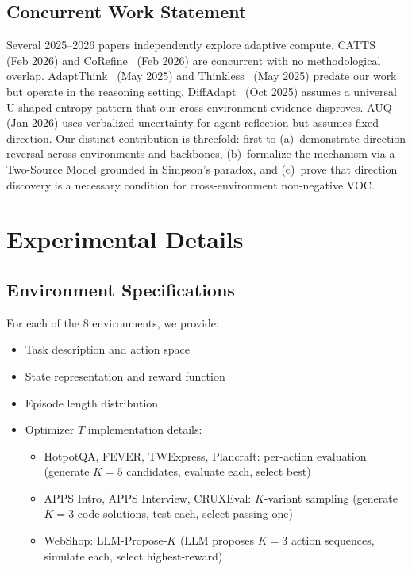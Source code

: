 \subsection{Concurrent Work Statement}

Several 2025--2026 papers independently explore adaptive compute.
CATTS~\citep{catts2026} (Feb 2026) and CoRefine~\citep{corefine2026}
(Feb 2026) are concurrent with no methodological overlap.
AdaptThink~\citep{adaptthink2025} (May 2025) and
Thinkless~\citep{thinkless2025} (May 2025) predate our work but
operate in the reasoning setting. DiffAdapt~\citep{diffadapt2025}
(Oct 2025) assumes a universal U-shaped entropy pattern that our
cross-environment evidence disproves.
AUQ~\citep{auq2026} (Jan 2026) uses verbalized uncertainty for
agent reflection but assumes fixed direction.
Our distinct contribution is threefold: first to (a)~demonstrate
direction reversal across environments and backbones, (b)~formalize
the mechanism via a Two-Source Model grounded in Simpson's paradox,
and (c)~prove that direction discovery is a necessary condition for
cross-environment non-negative VOC.


\section{Experimental Details}
\label{app:experiments}

\subsection{Environment Specifications}

For each of the 8 environments, we provide:
\begin{itemize}[nosep,leftmargin=*]
\item Task description and action space
\item State representation and reward function
\item Episode length distribution
\item Optimizer $T$ implementation details:
  \begin{itemize}[nosep]
  \item HotpotQA, FEVER, TWExpress, Plancraft: per-action evaluation
    (generate $K{=}5$ candidates, evaluate each, select best)
  \item APPS Intro, APPS Interview, CRUXEval: $K$-variant sampling
    (generate $K{=}3$ code solutions, test each, select passing one)
  \item WebShop: LLM-Propose-$K$ (LLM proposes $K{=}3$ action
    sequences, simulate each, select highest-reward)
  \end{itemize}
\end{itemize}

